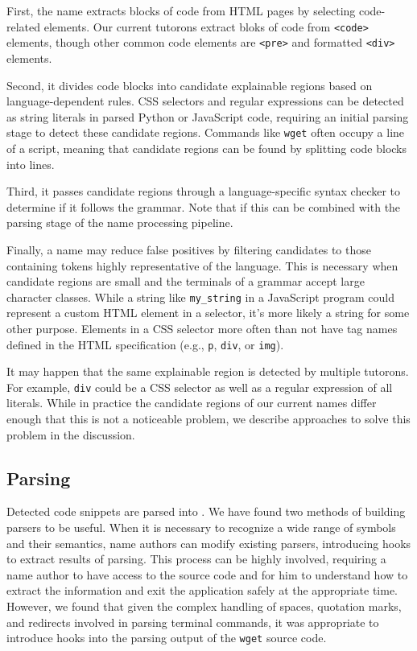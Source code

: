 First, the \gls{name} extracts blocks of code from HTML pages by selecting code-related elements.
Our current tutorons extract bloks of code from \texttt{<code>} elements, though other common code elements are \texttt{<pre>} and formatted \texttt{<div>} elements.

Second, it divides code blocks into candidate explainable regions based on language-dependent rules.
CSS selectors and regular expressions can be detected as string literals in parsed Python or JavaScript code, requiring an initial parsing stage to detect these candidate regions.
Commands like \texttt{wget} often occupy a line of a script, meaning that candidate regions can be found by splitting code blocks into lines.

Third, it passes candidate regions through a language-specific syntax checker to determine if it follows the grammar.
Note that if this can be combined with the parsing stage of the \gls{name} processing pipeline.

Finally, a \gls{name} may reduce false positives by filtering candidates to those containing tokens highly representative of the language.
This is necessary when candidate regions are small and the terminals of a grammar accept large character classes.
While a string like \texttt{\qs{}my\_string\qs{}} in a JavaScript program could represent a custom HTML element in a selector, it's more likely a string for some other purpose.
Elements in a CSS selector more often than not have tag names defined in the HTML specification (e.g., \texttt{p}, \texttt{div}, or \texttt{img}).

\begin{changes}
It may happen that the same explainable region is detected by multiple tutorons.
For example, \texttt{div} could be a CSS selector as well as a regular expression of all literals.
While in practice the candidate regions of our current \glspl{name} differ enough that this is not a noticeable problem, we describe approaches to solve this problem in the discussion.
\end{changes}

\subsection{Parsing}
Detected code snippets are parsed into .
We have found two methods of building parsers to be useful.
When it is necessary to recognize a wide range of symbols and their semantics, \gls{name} authors can modify existing parsers, introducing hooks to extract results of parsing.
This process can be highly involved, requiring a \gls{name} author to have access to the source code and for him to understand how to extract the information and exit the application safely at the appropriate time.
However, we found that given the complex handling of spaces, quotation marks, and redirects involved in parsing terminal commands, it was appropriate to introduce hooks into the parsing output of the \texttt{wget} source code.

